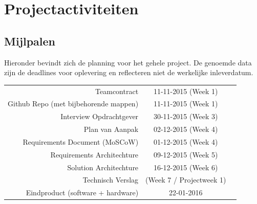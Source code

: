 \chapter{Projectactiviteiten}
\section{Mijlpalen}
Hieronder bevindt zich de planning voor het gehele project. De genoemde data zijn de deadlines voor oplevering en reflecteren niet de werkelijke inleverdatum.

\begin{tabular}{ r | c r }
  Teamcontract & 11-11-2015 (Week 1) \\
  Github Repo (met bijbehorende mappen) & 11-11-2015 (Week 1) \\
  Interview Opdrachtgever & 30-11-2015 (Week 3) \\
  Plan van Aanpak & 02-12-2015 (Week 4) \\
  Requirements Document (MoSCoW) & 01-12-2015 (Week 4) \\
  Requirements Architechture &  09-12-2015 (Week 5) \\
  Solution Architechture & 16-12-2015 (Week 6) \\
  Technisch Verslag	& (Week 7 / Projectweek 1) \\
  Eindproduct (software + hardware)	& 22-01-2016 \\
\end{tabular}

